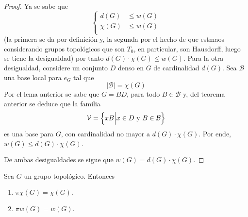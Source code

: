 \documentclass[12pt]{report}
\theoremstyle{largebreak}
\newcommand\abs[1]{\ensuremath{\lvert#1\rvert}}
\begin{document}
    \begin{proof}
        Ya se sabe que
        \begin{equation*}
            \left\{
                \begin{array}{rl}
                    d(G)&\leq w(G)\\
                    \chi(G)&\leq w(G)\\
                \end{array}
            \right.
        \end{equation*}
        (la primera se da por definición y, la segunda por el hecho de que estmaos considerando grupos topológicos que son $T_0$, en particular, son Hausdorff, luego se tiene la desigualdad) por tanto $d(G)\cdot\chi(G)\leq w(G)$. Para la otra desigualdad, considere un conjunto $D$ denso en $G$ de cardinalidad $d(G)$. Sea $\mathcal{B}$ una base local para $e_G$ tal que
        \begin{equation*}
            \abs{\mathcal{B}}=\chi(G)
        \end{equation*}
        Por el lema anterior se sabe que $G=BD$, para todo $B\in\mathcal{B}$ y, del teorema anterior se deduce que la familia
        \begin{equation*}
            \mathcal{V}=\left\{xB\Big|x\in D\textup{ y }B\in\mathcal{B} \right\}
        \end{equation*}
        es una base para $G$, con cardinalidad no mayor a $d(G)\cdot\chi(G)$. Por ende, $w(G)\leq d(G)\cdot\chi(G)$.

        De ambas desigualdades se sigue que $w(G)=d(G)\cdot\chi(G)$.
    \end{proof}

    \begin{theor}
        Sea $G$ un grupo topológico. Entonces
        \begin{enumerate}
            \item $\pi\chi(G)=\chi(G)$.
            \item $\pi w(G)=w(G)$.
        \end{enumerate}      
    \end{theor}
\end{document}
